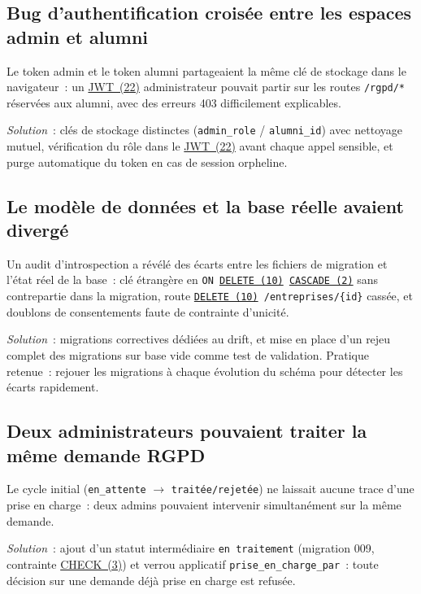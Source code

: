 \documentclass[12pt,a4paper]{report}
\begin{document}
\subsection{Bug d'authentification croisée entre les espaces admin et alumni}

Le token admin et le token alumni partageaient la même clé de stockage dans le navigateur~: un \hyperlink{abbr-JWT}{JWT~(22)} administrateur pouvait partir sur les routes \texttt{/rgpd/*} réservées aux alumni, avec des erreurs 403 difficilement explicables.

\textit{Solution}~: clés de stockage distinctes (\texttt{admin\_role} / \texttt{alumni\_id}) avec nettoyage mutuel, vérification du rôle dans le \hyperlink{abbr-JWT}{JWT~(22)} avant chaque appel sensible, et purge automatique du token en cas de session orpheline.

\subsection{Le modèle de données et la base réelle avaient divergé}

Un audit d'introspection a révélé des écarts entre les fichiers de migration et l'état réel de la base~: clé étrangère en \texttt{ON \hyperlink{abbr-DELETE}{DELETE~(10)} \hyperlink{abbr-CASCADE}{CASCADE~(2)}} sans contrepartie dans la migration, route \texttt{\hyperlink{abbr-DELETE}{DELETE~(10)} /entreprises/\{id\}} cassée, et doublons de consentements faute de contrainte d'unicité.

\textit{Solution}~: migrations correctives dédiées au drift, et mise en place d'un rejeu complet des migrations sur base vide comme test de validation. Pratique retenue~: rejouer les migrations à chaque évolution du schéma pour détecter les écarts rapidement.

\subsection{Deux administrateurs pouvaient traiter la même demande RGPD}

Le cycle initial (\texttt{en\_attente} $\rightarrow$ \texttt{traitée/rejetée}) ne laissait aucune trace d'une prise en charge~: deux admins pouvaient intervenir simultanément sur la même demande.

\textit{Solution}~: ajout d'un statut intermédiaire \texttt{en traitement} (migration 009, contrainte \hyperlink{abbr-CHECK}{CHECK~(3)}) et verrou applicatif \texttt{prise\_en\_charge\_par}~: toute décision sur une demande déjà prise en charge est refusée.
\end{document}
